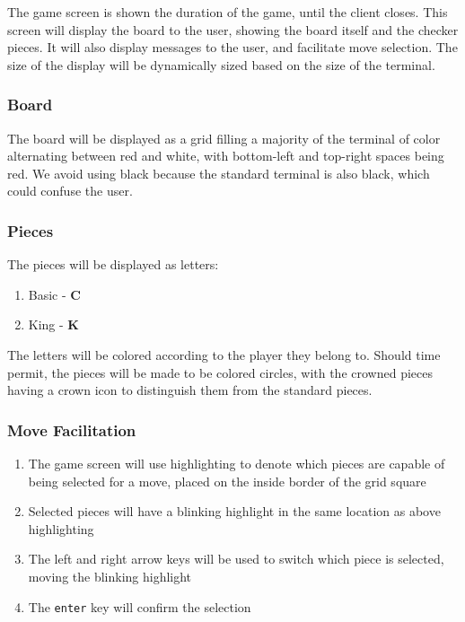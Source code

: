 \documentclass[letterpaper]{article}
\begin{document}
The game screen is shown the duration of the game, until the
client closes. This screen will display the board to the user,
showing the board itself and the checker pieces. It will also
display messages to the user, and facilitate move selection.
The size of the display will be dynamically sized based on
the size of the terminal.

\subsubsection{Board}
\label{sec:ui_game_board}

The board will be displayed as a grid filling a majority of
the terminal of color alternating between red and white,
with bottom-left and top-right spaces being red. We avoid
using black because the standard terminal is also black,
which could confuse the user.

\subsubsection{Pieces}
\label{sec:ui_game_pieces}

The pieces will be displayed as letters:

\begin{enumerate}
    \item Basic - \textbf{C}
    \item King - \textbf{K}
\end{enumerate}

The letters will be colored according to the player they
belong to. Should time permit, the pieces will be made
to be colored circles, with the crowned pieces having a
crown icon to distinguish them from the standard pieces.

\subsubsection{Move Facilitation}
\label{sec:ui_game_move}

\begin{enumerate}
    \item The game screen will use highlighting to denote which
          pieces are capable of being selected for a move,
          placed on the inside border of the grid square
    \item Selected pieces will have a blinking highlight in the
          same location as above highlighting
    \item The left and right arrow keys will be used to switch
          which piece is selected, moving the blinking
          highlight
    \item The \texttt{enter} key will confirm the selection
\end{enumerate}
\end{document}
